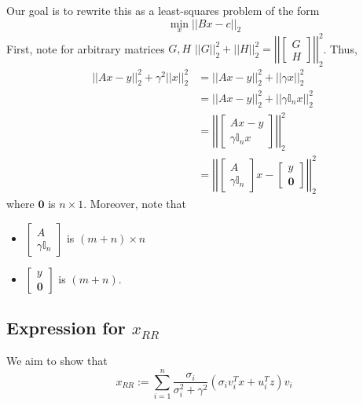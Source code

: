 \documentclass[paper=a4, fontsize=11pt]{scrartcl} %
\numberwithin{equation}{section} %
\numberwithin{figure}{section} %
\numberwithin{table}{section} %
\begin{document}
Our goal is to rewrite this as a least-squares problem of the form
\[\min_x ||Bx - c||_2\]
First, note for arbitrary matrices $G, H$ $||G||_2^2 + ||H||_2^2 = \left|\left| \left[ \begin{matrix}G\\H\end{matrix} \right] \right|\right|_2^2$. Thus,
\begin{align*}
||Ax - y||_2^2 + \gamma^2 ||x||_2^2 &= ||Ax - y||_2^2 +||\gamma x||_2^2 \\
   &= ||Ax - y||_2^2 +||\gamma \mathbb{I}_n x||_2^2 \\
   &= \left|\left| \left[ \begin{matrix}Ax - y\\ \gamma \mathbb{I}_n x \end{matrix} \right] \right|\right|_2^2 \\
   &= \left|\left| \left[ \begin{matrix}A\\ \gamma \mathbb{I}_n \end{matrix} \right] x - \left[ \begin{matrix}y\\ \bm{0} \end{matrix} \right] \right|\right|_2^2
\end{align*}
where $\bm{0}$ is $n \times 1$. Moreover, note that
\begin{itemize}
\item $ \left[ \begin{matrix}A\\ \gamma \mathbb{I}_n \end{matrix} \right] $ is $(m+n) \times n$
\item $\left[ \begin{matrix}y\\ \bm{0} \end{matrix} \right]$ is $(m+n)$.
\end{itemize}

\subsection{Expression for $x_{RR}$}

We aim to show that
\[x_{RR} := \sum_{i=1}^n \frac{\sigma_i}{\sigma_i^2 + \gamma^2}(\sigma_i v_i^T x + u_i^T z)v_i\]
\end{document}
